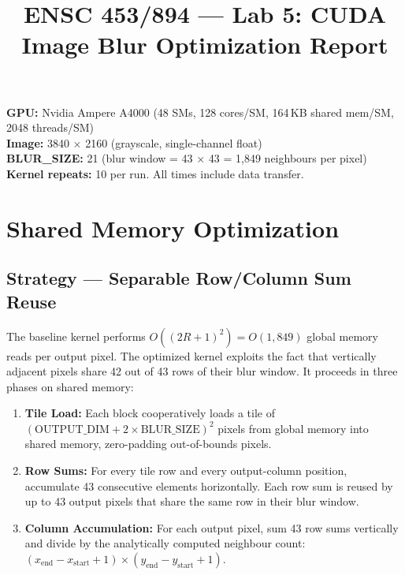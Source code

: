 \documentclass[11pt]{article}
\title{ENSC 453/894 --- Lab 5: CUDA Image Blur Optimization Report}
\author{}
\date{}
\begin{document}
\maketitle

\noindent\textbf{GPU:} Nvidia Ampere A4000 (48 SMs, 128 cores/SM, 164\,KB shared mem/SM, 2048 threads/SM)\\
\textbf{Image:} 3840 $\times$ 2160 (grayscale, single-channel float)\\
\textbf{BLUR\_SIZE:} 21 (blur window = 43 $\times$ 43 = 1,849 neighbours per pixel)\\
\textbf{Kernel repeats:} 10 per run. All times include data transfer.

\section{Shared Memory Optimization}

\subsection{Strategy --- Separable Row/Column Sum Reuse}

The baseline kernel performs $O((2R{+}1)^2) = O(1{,}849)$ global memory reads per output
pixel. The optimized kernel exploits the fact that vertically adjacent pixels share
42 out of 43 rows of their blur window. It proceeds in three phases on shared memory:

\begin{enumerate}[]
  \item \textbf{Tile Load:} Each block cooperatively loads a tile of
        $(\text{OUTPUT\_DIM} + 2 \times \text{BLUR\_SIZE})^2$ pixels from global memory
        into shared memory, zero-padding out-of-bounds pixels.
  \item \textbf{Row Sums:} For every tile row and every output-column position,
        accumulate 43 consecutive elements horizontally. Each row sum is reused by
        up to 43 output pixels that share the same row in their blur window.
  \item \textbf{Column Accumulation:} For each output pixel, sum 43 row sums
        vertically and divide by the analytically computed neighbour count:
        $(x_{\text{end}} - x_{\text{start}} + 1) \times (y_{\text{end}} - y_{\text{start}} + 1)$.
\end{enumerate}
\end{document}
